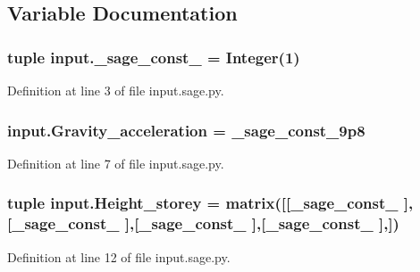 \subsection{Variable Documentation}
\hypertarget{namespaceinput_a221dbe0b6723929966d68d807eb5b2db}{}
\subsubsection[{\+\_\+sage\+\_\+const\+\_\+1}]{\setlength{\rightskip}{0pt plus 5cm}tuple input.\+\_\+sage\+\_\+const\+\_ = Integer(1)}\label{namespaceinput_a221dbe0b6723929966d68d807eb5b2db}


Definition at line 3 of file input.\+sage.\+py.

\hypertarget{namespaceinput_a55ab15c1c171513e99332aa50c723764}{}
\subsubsection[{Gravity\+\_\+acceleration}]{\setlength{\rightskip}{0pt plus 5cm}input.\+Gravity\+\_\+acceleration = \+\_\+sage\+\_\+const\+\_\+9p8}\label{namespaceinput_a55ab15c1c171513e99332aa50c723764}


Definition at line 7 of file input.\+sage.\+py.

\hypertarget{namespaceinput_a01ad5b8730285b6aaebb2bc3f3fc0894}{}
\subsubsection[{Height\+\_\+storey}]{\setlength{\rightskip}{0pt plus 5cm}tuple input.\+Height\+\_\+storey = matrix(\mbox{[}\mbox{[}\+\_\+sage\+\_\+const\+\_ \mbox{]},\mbox{[}\+\_\+sage\+\_\+const\+\_ \mbox{]},\mbox{[}\+\_\+sage\+\_\+const\+\_ \mbox{]},\mbox{[}\+\_\+sage\+\_\+const\+\_ \mbox{]},\mbox{]})}\label{namespaceinput_a01ad5b8730285b6aaebb2bc3f3fc0894}


Definition at line 12 of file input.\+sage.\+py.

\hypertarget{namespaceinput_a0840d963ea24db338f3ab4457defb494}{}
